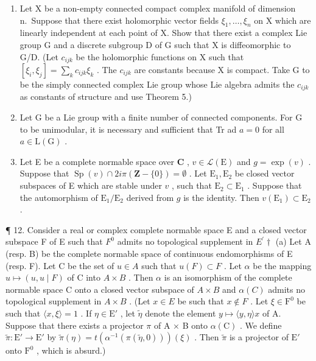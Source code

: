 \begin{enumerate}
\def\labelenumi{\arabic{enumi}.}
\setcounter{enumi}{8}
\item
  Let X be a non-empty connected compact complex manifold of dimension n.~Suppose that there exist holomorphic vector fields \(\xi_{1},\ldots,\xi_{n}\) on X which are linearly independent at each point of X. Show that there exist a complex Lie group G and a discrete subgroup D of G such that X is diffeomorphic to G/D. (Let \(c_{ijk}\) be the holomorphic functions on X such that \([\xi_{i},\xi_{j}]=\sum_{k}c_{ijk}\xi_{k}\) . The \(c_{ijk}\) are constants because X is compact. Take G to be the simply connected complex Lie group whose Lie algebra admits the \(c_{ijk}\) as constants of structure and use Theorem 5.)
\item
  Let G be a Lie group with a finite number of connected components. For G to be unimodular, it is necessary and sufficient that Tr ad \(a = 0\) for all \(a \in \mathrm{L}(\mathrm{G})\) .
\item
  Let E be a complete normable space over \(\mathbf{C}\) , \(v \in \mathcal{L}(\mathrm{E})\) and \(g = \exp(v)\) . Suppose that \(\operatorname{Sp}(v) \cap 2i\pi(\mathbf{Z} - \{0\}) = \emptyset\) . Let \(\mathrm{E}_1, \mathrm{E}_2\) be closed vector subspaces of E which are stable under \(v\) , such that \(\mathrm{E}_2 \subset \mathrm{E}_1\) . Suppose that the automorphism of \(\mathrm{E}_1 / \mathrm{E}_2\) derived from \(g\) is the identity. Then \(v(\mathrm{E}_1) \subset \mathrm{E}_2\) .
\end{enumerate}

¶ 12. Consider a real or complex complete normable space E and a closed vector subspace F of E such that \(F^{0}\) admits no topological supplement in \(E^{\prime}\dagger\) (a) Let A (resp. B) be the complete normable space of continuous endomorphisms of E (resp. F). Let C be the set of \(u \in A\) such that \(u(F) \subset F\) . Let \(\alpha\) be the mapping \(u \mapsto (u, u \mid F)\) of C into \(A \times B\) . Then \(\alpha\) is an isomorphism of the complete normable space C onto a closed vector subspace of \(A \times B\) and \(\alpha(C)\) admits no topological supplement in \(A \times B\) . (Let \(x \in E\) be such that \(x \notin F\) . Let \(\xi \in \mathrm{F}^0\) be such that \(\langle x, \xi \rangle = 1\) . If \(\eta \in \mathrm{E}'\) , let \(\tilde{\eta}\) denote the element \(y \mapsto \langle y, \eta \rangle x\) of A. Suppose that there exists a projector \(\pi\) of A × B onto \(\alpha(\mathrm{C})\) . We define \(\tilde{\pi} \colon \mathrm{E}' \to \mathrm{E}'\) by \(\tilde{\pi}(\eta) = t(\alpha^{-1}(\pi(\tilde{\eta}, 0)))(\xi)\) . Then \(\tilde{\pi}\) is a projector of \(\mathrm{E}'\) onto \(\mathrm{F}^0\) , which is absurd.)

